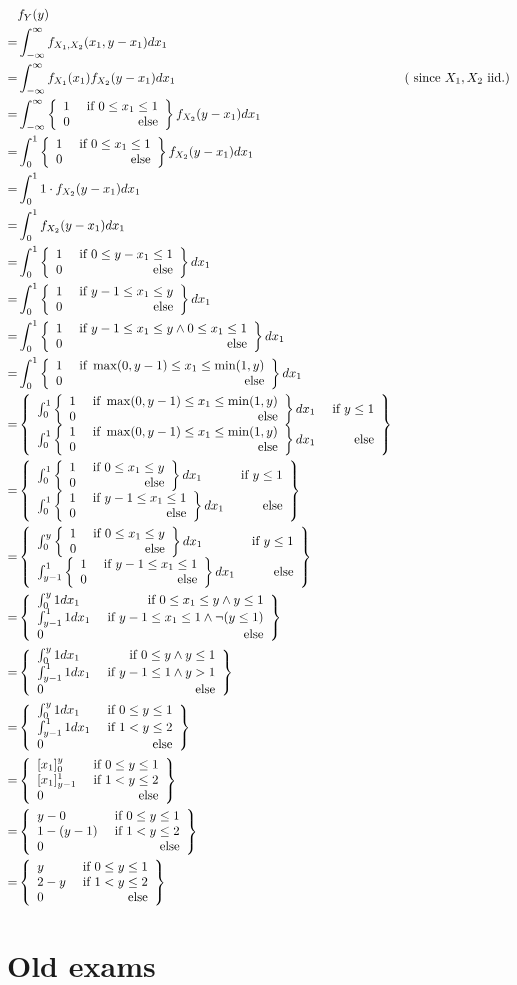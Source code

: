 \documentclass{article}
\begin{document}
\begin{align*}
	 & f_Y(y) \\
	=& \int_{-\infty}^\infty f_{X_1,X_2}(x_1,y-x_1)dx_1 \\
	=& \int_{-\infty}^\infty f_{X_1}(x_1)f_{X_2}(y-x_1)dx_1 & (\text{ since } X_1,X_2\text{ iid.}) \\
	=& \int_{-\infty}^\infty \casesii{1}{0\leq x_1 \leq 1}{0}f_{X_2}(y-x_1)dx_1 \\
	=& \int_0^1 \casesii{1}{0\leq x_1 \leq 1}{0}f_{X_2}(y-x_1)dx_1 \\
	=& \int_0^1 1\cdot f_{X_2}(y-x_1)dx_1 \\
	=& \int_0^1 f_{X_2}(y-x_1)dx_1 \\
	=& \int_0^1 \casesii{1}{0\leq y-x_1\leq 1}{0}dx_1 \\
	=& \int_0^1 \casesii{1}{y-1\leq x_1\leq y}{0}dx_1 \\
	=& \int_0^1 \casesii{1}{y-1\leq x_1\leq y\wedge 0\leq x_1 \leq 1}{0}dx_1 \\
	=& \int_0^1 \casesii{1}{\max(0,y-1)\leq x_1\leq \min(1,y)}{0}dx_1 \\
	=& \casesii{\int_0^1 \casesii{1}{\max(0,y-1)\leq x_1\leq \min(1,y)}{0}dx_1}{y \leq 1}{\int_0^1 \casesii{1}{\max(0,y-1)\leq x_1\leq \min(1,y)}{0}dx_1} \\
	=& \casesii{\int_0^1 \casesii{1}{0\leq x_1\leq y}{0}dx_1}{y \leq 1}{\int_0^1 \casesii{1}{y-1\leq x_1\leq 1}{0}dx_1} \\
	=& \casesii{\int_0^y \casesii{1}{0\leq x_1\leq y}{0}dx_1}{y \leq 1}{\int_{y-1}^1 \casesii{1}{y-1\leq x_1\leq 1}{0}dx_1} \\
	=& \casesiii{\int_0^y 1dx_1}{0\leq x_1 \leq y \wedge y\leq 1}{\int_{y-1}^1 1dx_1}{y-1\leq x_1 \leq 1 \wedge \neg(y\leq 1)}{0} \\
	=& \casesiii{\int_0^y 1dx_1}{0\leq y \wedge y\leq 1}{\int_{y-1}^1 1dx_1}{y-1\leq 1 \wedge y>1}{0} \\
	=& \casesiii{\int_0^y 1dx_1}{0\leq y\leq 1}{\int_{y-1}^1 1dx_1}{1<y\leq 2}{0} \\
	=& \casesiii{\hakparen{x_1}_0^y}{0\leq y\leq 1}{\hakparen{x_1}_{y-1}^1}{1<y\leq 2}{0} \\
	=& \casesiii{y-0}{0\leq y\leq 1}{1-(y-1)}{1<y\leq 2}{0} \\
	=& \casesiii{y}{0\leq y\leq 1}{2-y}{1<y\leq 2}{0} \\
\end{align*}

\section{Old exams}
\end{document}
